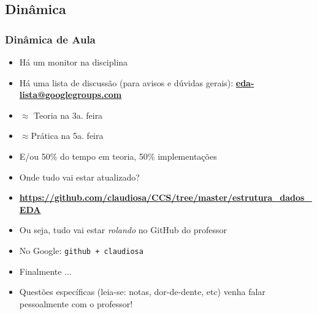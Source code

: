 \subsection{Dinâmica}
\begin{frame} [allowframebreaks=0.9]

    \frametitle{Dinâmica de Aula}

    \begin{itemize}
    
       \item Há um monitor na disciplina
       
       \item Há uma lista de discussão (para avisos e dúvidas gerais):  \textbf{\url{eda-lista@googlegroups.com}}
       
      \item $\approx $ Teoria na 3a. feira
      \item $\approx $Prática na 5a. feira
      \item E/ou 50\% do tempo em teoria, 50\% implementações 
      \item Onde tudo vai estar atualizado?
   \end{itemize}
    \pause
 
 \newpage
    
  \begin{itemize}    
      \item \textcolor{red}{\textbf{\url{https://github.com/claudiosa/CCS/tree/master/estrutura_dados_EDA}}} 
     
      \item Ou seja, tudo vai estar \textit{rolando} no GitHub do professor
      
      \item No Google: \texttt{github + claudiosa}
   
      \item Finalmente ...   
  \end{itemize}
    
    
    \pause
    \newpage
    
    \begin{itemize}    
    
   \item Questões específicas (leia-se: notas, dor-de-dente, etc) venha falar pessoalmente com o professor!
      
   \end{itemize}

\end{frame}




